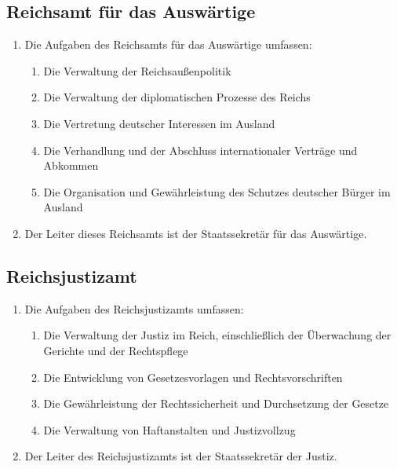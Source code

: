 \documentclass{article}
\begin{document}
\subsection{Reichsamt für das Auswärtige}
\begin{enumerate}[(1)]
    \item Die Aufgaben des Reichsamts für das Auswärtige umfassen:
    \begin{enumerate}[1.]
        \item Die Verwaltung der Reichsaußenpolitik
        \item Die Verwaltung der diplomatischen Prozesse des Reichs
        \item Die Vertretung deutscher Interessen im Ausland
        \item Die Verhandlung und der Abschluss internationaler Verträge und Abkommen
        \item Die Organisation und Gewährleistung des Schutzes deutscher Bürger im Ausland
    \end{enumerate}
    \item Der Leiter dieses Reichsamts ist der Staatssekretär für das Auswärtige.
\end{enumerate}

\subsection{Reichsjustizamt}
\begin{enumerate}[(1)]
    \item Die Aufgaben des Reichsjustizamts umfassen:
    \begin{enumerate}[1.]
        \item Die Verwaltung der Justiz im Reich, einschließlich der Überwachung der Gerichte und der Rechtspflege
        \item Die Entwicklung von Gesetzesvorlagen und Rechtsvorschriften
        \item Die Gewährleistung der Rechtssicherheit und Durchsetzung der Gesetze
        \item Die Verwaltung von Haftanstalten und Justizvollzug
    \end{enumerate}
    \item Der Leiter des Reichsjustizamts ist der Staatssekretär der Justiz.
\end{enumerate}
\end{document}
